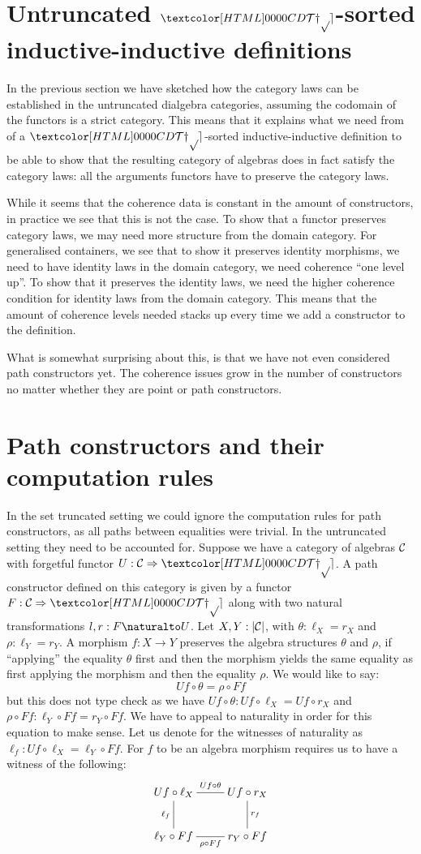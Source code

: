 \section{Untruncated $\TYPE$-sorted inductive-inductive definitions}

In the previous section we have sketched how the category laws can be
established in the untruncated dialgebra categories, assuming the
codomain of the functors is a strict category. This means that it
explains what we need from of a $\TYPE$-sorted inductive-inductive
definition to be able to show that the resulting category of algebras
does in fact satisfy the category laws: all the arguments functors
have to preserve the category laws.

While it seems that the coherence data is constant in the amount of
constructors, in practice we see that this is not the case. To show
that a functor preserves category laws, we may need more structure
from the domain category. For generalised containers, we see that to
show it preserves identity morphisms, we need to have identity laws in
the domain category, \ie we need coherence ``one level up''. To show
that it preserves the identity laws, we need the higher coherence
condition for identity laws from the domain category. This means that
the amount of coherence levels needed stacks up every time we add a
constructor to the definition.

What is somewhat surprising about this, is that we have not even
considered path constructors yet. The coherence issues grow in the
number of constructors no matter whether they are point or path
constructors.

\section{Path constructors and their computation rules}

In the set truncated setting we could ignore the computation rules for
path constructors, as all paths between equalities were trivial. In
the untruncated setting they need to be accounted for. Suppose we have
a category of algebras $\mathcal{C}$ with forgetful functor
$U : \Func{\Cc}{\TYPE}$. A path constructor defined on this category
is given by a functor $F : \Func{\Cc}{\TYPE}$ along with two natural
transformations $l,r : \Nat{F}{U}$. Let $X, Y : | \mathcal{C} |$, with
$\theta : \ell_X = r_X$ and $\rho : \ell_Y = r_Y$. A morphism
$f : X \to Y$ preserves the algebra structures $\theta$ and $\rho$, if
``applying'' the equality $\theta$ first and then the morphism yields
the same equality as first applying the morphism and then the equality
$\rho$. We would like to say:
$$
U f \circ \theta = \rho \circ F f
$$
but this does not type check as we have
$U f \circ \theta : U f \circ \ell_X = U f \circ r_X$ and
$\rho \circ Ff : \ell_Y \circ F f = r_Y \circ F f$. We have to appeal to
naturality in order for this equation to make sense. Let us denote for
the witnesses of naturality as $\ell_f : Uf \circ \ell_X = \ell_Y \circ
Ff$.
For $f$ to be an algebra morphism requires us to have a witness of the
following:
$$
\xymatrix{
U f \circ \ell_X
\ar@{-}[r]^{U f \circ \theta}
\ar@{-}[d]_{\ell_f}
&U f \circ r_X
\ar@{-}[d]^{r_f}
\\
\ell_Y \circ Ff
\ar@{-}[r]_{\rho \circ Ff}
&r_Y \circ Ff
}
$$
